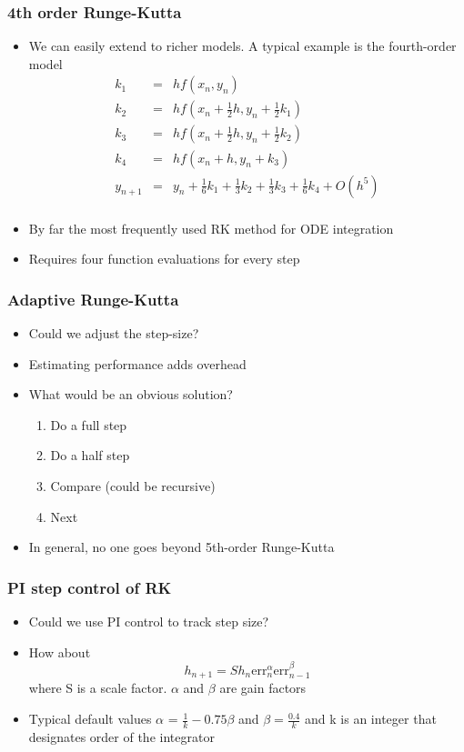 \documentclass[10pt]{beamer}
\begin{document}
\begin{frame}
  \frametitle{4th order Runge-Kutta}
  \begin{itemize}
  \item We can easily extend to richer models. A typical example is the fourth-order model
    \[
      \begin{array}{rcl}
        k_1 & = & h f( x_n, y_n)\\
        k_2 & = & h f( x_n + \frac{1}{2} h, y_n + \frac{1}{2} k_1)\\ 
        k_3 & = & h f( x_n + \frac{1}{2} h, y_n + \frac{1}{2} k_2)\\
        k_4 & = & h f( x_n + h, y_n + k_3)\\
        y_{n+1} & = & y_n + \frac{1}{6} k_1 + \frac{1}{3} k_2 + \frac{1}{3} k_3 + \frac{1}{6} k_4 + O(h^5)\\        
      \end{array}
    \]
  \item By far the most frequently used RK method for ODE integration
  \item Requires four function evaluations for every step
  \end{itemize}
\end{frame}

\begin{frame}
  \frametitle{Adaptive Runge-Kutta}
  \begin{itemize}
  \item Could we adjust the step-size? 
  \item Estimating performance adds overhead
  \item What would be an obvious solution? \pause
    \begin{enumerate}
    \item Do a full step
    \item Do a half step
    \item Compare (could be recursive)
    \item Next
    \end{enumerate}
  \item In general, no one goes beyond 5th-order Runge-Kutta
  \end{itemize}
\end{frame}

\begin{frame}
  \frametitle{PI step control of RK}
  \begin{itemize}
  \item Could we use PI control to track step size? \pause
  \item How about
    \[
      h_{n+1} = S h_n \mbox{err}_n^{\alpha} \mbox{err}_{n-1}^{\beta}
    \]
    where S is a scale factor. $\alpha$ and $\beta$ are gain factors
  \item Typical default values $\alpha$ = $\frac{1}{k} - 0.75 \beta$
    and $\beta = \frac{0.4}{k}$ and k is an integer that designates
    order of the integrator
  \end{itemize}
\end{frame}
\end{document}
